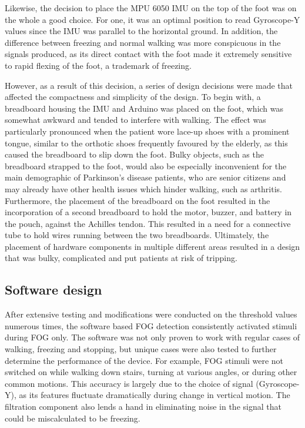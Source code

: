 \documentclass[titlepage]{article}
\begin{document}
\begin{doublespacing}
Likewise, the decision to place the MPU 6050 IMU on the top of the foot was on the whole a good choice. For one, it was an optimal position to read Gyroscope-Y values since the IMU was parallel to the horizontal ground. In addition, the difference between freezing and normal walking was more conspicuous in the signals produced, as its direct contact with the foot made it extremely sensitive to rapid flexing of the foot, a trademark of freezing. 

However, as a result of this decision, a series of design decisions were made that affected the compactness and simplicity of the design. To begin with, a breadboard housing the IMU and Arduino was placed on the foot, which was somewhat awkward and tended to interfere with walking. The effect was particularly pronounced when the patient wore lace-up shoes with a prominent tongue, similar to the orthotic shoes frequently favoured by the elderly, as this caused the breadboard to slip down the foot. Bulky objects, such as the breadboard strapped to the foot, would also be especially inconvenient for the main demographic of Parkinson's disease patients, who are senior citizens and may already have other health issues which hinder walking, such as arthritis. Furthermore, the placement of the breadboard on the foot resulted in the incorporation of a second breadboard to hold the motor, buzzer, and battery in the pouch, against the Achilles tendon. This resulted in a need for a connective tube to hold wires running between the two breadboards. Ultimately, the placement of hardware components in multiple different areas resulted in a design that was bulky, complicated and put patients at risk of tripping.

\subsection{Software design}

After extensive testing and modifications were conducted on the threshold values numerous times, the software based FOG detection consistently activated stimuli during FOG only. The software was not only proven to work with regular cases of walking, freezing and stopping, but unique cases were also tested to further determine the performance of the device. For example, FOG stimuli were not switched on while walking down stairs, turning at various angles, or during other common motions. This accuracy is largely due to the choice of signal (Gyroscope-Y), as its features fluctuate dramatically during change in vertical motion. The filtration component also lends a hand in eliminating noise in the signal that could be miscalculated to be freezing. 


\end{doublespacing}
\end{document}

